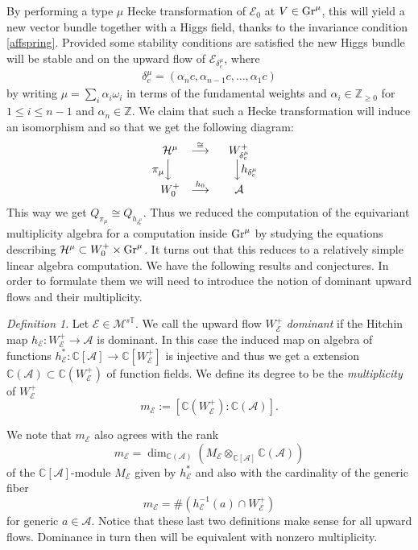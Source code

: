 \documentclass[12pt]{article}
\numberwithin{equation}{section}
\theoremstyle{remark}
\newtheorem{definition}[theorem]{Definition}
\numberwithin{theorem}{section}
\def\beq{\begin{eqnarray}}
\def\eeq{\end{eqnarray}}
\def\calE{{\mathcal E}}
\def\C{\mathbb{C}}
\def\M{{\mathcal{M}}}
\def\calA{{\mathcal{A}}}
\def\calH{\mathcal{H}}
\def\N{\mathbb{Z}_{\geq 0}}
\newcommand{\T}{{\mathbb{T}}}
\def\Z{\mathbb{Z}}
\newcommand{\Gr}{\textnormal{Gr}}
\numberwithin{equation}{section}
\begin{document}
By performing a type $\mu$ Hecke transformation of $\calE_0$ at $V\in \Gr^\mu$, this  will yield a new vector bundle together with a Higgs field, thanks to the invariance condition \eqref{affspring}. Provided some stability conditions are satisfied the new Higgs bundle will be stable and on the upward flow of $\calE_{\delta^\mu_c}$, where \beq \label{deltamuc}\delta^\mu_c=(\alpha_n c,\alpha_{n-1} c,\dots,\alpha_{1} c)\eeq by writing $\mu=\sum_{i} \alpha_i \omega_i$ in terms of the fundamental weights and $\alpha_i\in \N$ for $1\leq i \leq n-1$ and $\alpha_n\in \Z$. We claim that such a Hecke transformation will induce an isomorphism and so that we get the following diagram: \beq\label{diagram} \begin{array}{ccc}\calH^\mu&\stackrel{\cong}{\longrightarrow}& W^+_{\delta^\mu_c}\\ \!\!\!\!\!\!\!\!\! \pi_\mu{\Big\downarrow} && \,\,\,\,\,\,\, {\Big\downarrow} h_{{\delta^\mu_c}} \\ W^+_0 &\stackrel{h_0}{\longrightarrow}& \calA \end{array}\eeq
This way we  get $Q_{\pi_\mu}\cong Q_{h_{\delta^\mu_c}}$. Thus we  reduced the computation of the equivariant multiplicity algebra for a computation inside $\Gr^\mu$ by studying the equations describing $\calH^\mu\subset W^+_0 \times \Gr^\mu$. It turns out that this reduces to a relatively simple linear algebra computation. We have the following results and conjectures. In order to formulate them we will need to introduce the notion of dominant upward flows and their multiplicity. 

\begin{definition} Let $\calE\in \M^{s\T}$. We call the upward flow $W^+_\calE$ {\em dominant} if the Hitchin map $h_\calE:W^+_\calE\to \calA$ is dominant. In this case the induced map on algebra of functions $h_\calE^*: \C[{\calA}]\to \C[{W^+_\calE}]$ is injective and thus we get a extension $\C(\calA)\subset \C(W^+_\calE)$ of function fields. We define its degree to be the {\em multiplicity} of $W^+_\calE$  $$m_\calE:=[ \C(W^+_\calE):\C(\calA)].$$
\end{definition}

We note that $m_\calE$ also agrees with the rank $$m_\calE=\dim_{\C(\calA)} (M_\calE\otimes_{\C[\calA]} \C(\calA))$$ of the $\C[\calA]$-module $M_\calE$ given by $h_\calE^*$ and also with the cardinality of the generic fiber $$m_\calE=\#(h_\calE^{-1}(a)\cap W^+_\calE)$$ for generic $a\in\calA$. 
Notice that these last two definitions make sense for all upward flows. Dominance in turn then will be equivalent with nonzero multiplicity. 
\end{document}
